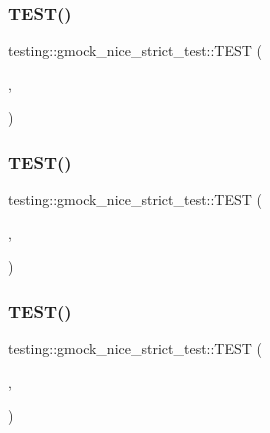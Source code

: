 \subsubsection{\texorpdfstring{TEST()}{TEST()}\hspace{0.1cm}{\footnotesize\ttfamily [3/27]}}
{\footnotesize\ttfamily testing\+::gmock\+\_\+nice\+\_\+strict\+\_\+test\+::\+T\+E\+ST (\begin{DoxyParamCaption}\item[{Nice\+Mock\+Test}]{,  }\item[{Unexpected\+Call\+Fails}]{ }\end{DoxyParamCaption})}

\mbox{\label{namespacetesting_1_1gmock__nice__strict__test_a4172e1193c21d61e34d9b2c379d2f6be}} 
\subsubsection{\texorpdfstring{TEST()}{TEST()}\hspace{0.1cm}{\footnotesize\ttfamily [4/27]}}
{\footnotesize\ttfamily testing\+::gmock\+\_\+nice\+\_\+strict\+\_\+test\+::\+T\+E\+ST (\begin{DoxyParamCaption}\item[{Nice\+Mock\+Test}]{,  }\item[{Non\+Default\+Constructor}]{ }\end{DoxyParamCaption})}

\mbox{\label{namespacetesting_1_1gmock__nice__strict__test_a81bfeea94824935648545225f5dd3c00}} 
\subsubsection{\texorpdfstring{TEST()}{TEST()}\hspace{0.1cm}{\footnotesize\ttfamily [5/27]}}
{\footnotesize\ttfamily testing\+::gmock\+\_\+nice\+\_\+strict\+\_\+test\+::\+T\+E\+ST (\begin{DoxyParamCaption}\item[{Nice\+Mock\+Test}]{,  }\item[{Non\+Default\+Constructor10}]{ }\end{DoxyParamCaption})}

